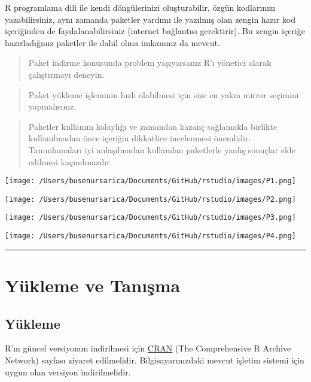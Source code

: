 \documentclass[
]{book}
\begin{document}
R programlama dili ile kendi döngülerinizi oluşturabilir, özgün kodlarınızı yazabilirsiniz, aynı zamanda paketler yardımı ile yazılmış olan zengin hazır kod içeriğinden de faydalanabilirsiniz (internet bağlantısı gerektirir). Bu zengin içeriğe hazırladığınız paketler ile dahil olma imkanınız da mevcut.

\begin{quote}
Paket indirme konusunda problem yaşıyorsanız R'ı yönetici olarak çalıştırmayı deneyin.
\end{quote}

\begin{quote}
Paket yükleme işleminin hızlı olabilmesi için size en yakın mirror seçimini yapmalısınız.
\end{quote}

\begin{quote}
Paketler kullanım kolaylığı ve zamandan kazanç sağlamakla birlikte kullanılmadan önce içeriğin dikkatlice incelenmesi önemlidir. Tanımlamaları iyi anlaşılmadan kullanılan paketlerle yanlış sonuçlar elde edilmesi kaçınılmazdır.
\end{quote}

\texttt{[image: /Users/busenursarica/Documents/GitHub/rstudio/images/P1.png]}

\texttt{[image: /Users/busenursarica/Documents/GitHub/rstudio/images/P2.png]}

\texttt{[image: /Users/busenursarica/Documents/GitHub/rstudio/images/P3.png]}

\texttt{[image: /Users/busenursarica/Documents/GitHub/rstudio/images/P4.png]}

\begin{center}\rule{0.5\linewidth}{0.5pt}\end{center}

\hypertarget{yuxfckleme-ve-tanux131ux15fma}{%
\chapter{Yükleme ve Tanışma}\label{yuxfckleme-ve-tanux131ux15fma}}

\hypertarget{yuxfckleme}{%
\section{Yükleme}\label{yuxfckleme}}

R'ın güncel versiyonun indirilmesi için \href{http://www.cran.r-project.org}{CRAN} (The Comprehensive R Archive Network) sayfası ziyaret edilmelidir. Bilgisayarınızdaki mevcut işletim sistemi için uygun olan versiyon indirilmelidir.
\end{document}
